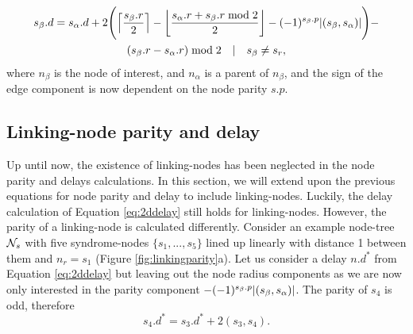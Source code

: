 \begin{multline}\label{eq:2ddelay}
  s_\beta.d = s_\alpha.d + 2\Bigg({\left \lceil \frac{s_\beta.r}{2} \right \rceil } - {\left \lfloor \frac{s_\alpha.r + s_\beta.r \bmod 2}{2} \right \rfloor } - (-1)^{s_\beta.p}\abs{(s_\beta,s_\alpha)}\Bigg) - \\
  (s_\beta.r - s_\alpha.r) \bmod 2 \hspace{1em} | \hspace{1em} s_\beta \neq s_r,
\end{multline}
where $n_\beta$ is the node of interest, and $n_\alpha$ is a parent of $n_\beta$, and the sign of the edge component is now dependent on the node parity $s.p$.



\subsection{Linking-node parity and delay}\label{sec:linkparitydelay}

Up until now, the existence of linking-nodes has been neglected in the node parity and delays calculations. In this section, we will extend upon the previous equations for node parity and delay to include linking-nodes. Luckily, the delay calculation of Equation \eqref{eq:2ddelay} still holds for linking-nodes. However, the parity of a linking-node is calculated differently. Consider an example node-tree $\mathcal{N}_s$ with five syndrome-nodes $\{s_1,...,s_5\}$ lined up linearly with distance 1 between them and $n_r = s_1$ (Figure \ref{fig:linkingparity}a). Let us consider a delay $n.d^*$ from Equation \eqref{eq:2ddelay} but leaving out the node radius components as we are now only interested in the parity component $- (-1)^{s_\beta.p}\abs{(s_\beta,s_\alpha)}$. The parity of $s_4$ is odd, therefore
\begin{equation*}
  s_4.d^* = s_3.d^* + 2(s_3, s_4).
\end{equation*}



